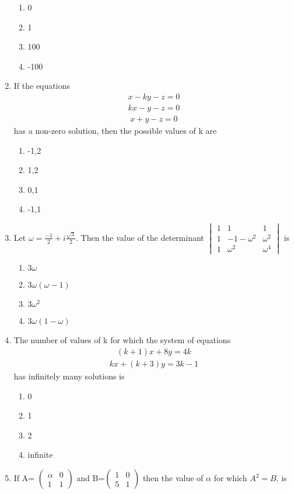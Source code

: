 \begin{enumerate}[label=\arabic*.,ref=\thesubsection.\theenumi]
\begin{enumerate}
 \item 0
 \item 1
 \item 100
 \item -100
 \end{enumerate}
 \item If the equations 
 \begin{align} x-ky-z=0 
 \end{align}  
 \begin{align} kx-y-z=0 
 \end{align} 
 \begin{align} x+y-z=0 
 \end{align} has a non-zero solution, then the possible values of k are
 \begin{enumerate}
 \item -1,2
 \item 1,2
 \item 0,1
 \item -1,1
 \end{enumerate}
 \item Let $\omega=\frac{-1}{2}+i\frac{\sqrt3}{2}$. Then the value of the determinant $\begin{vmatrix} 1 & 1 & 1  \\ 1 & -1-\omega^2 & \omega^2 \\ 1 & \omega^2 & \omega^4 \end{vmatrix}$ is
 \begin{enumerate}
 \item $3\omega$
 \item $3\omega(\omega-1)$
 \item $3\omega^2$
 \item $3\omega(1-\omega)$
 \end{enumerate}
 \item The number of values of k for which the system of equations 
 \begin{align} (k+1)x+8y=4k 
 \end{align} 
 \begin{align} kx+(k+3)y=3k-1
 \end{align} has infinitely many solutions is
\begin{enumerate}
 \item 0
 \item 1
 \item 2
 \item infinite
 \end{enumerate}
 \item If A= $\begin{pmatrix} \alpha & 0  \\ 1 & 1 \end{pmatrix}$ and B=$\begin{pmatrix} 1 & 0  \\ 5 & 1 \end{pmatrix}$ then the value of $\alpha$ for which $A^2=B$, is

\end{enumerate}
